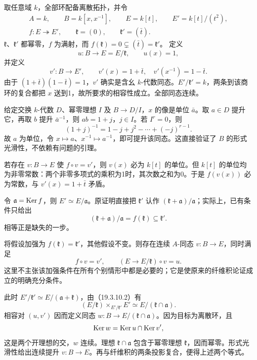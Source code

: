 取任意域 $k$，全部环配备离散拓扑，并令
\[
\begin{gathered}
 A=k,\qquad B=k[x,x^{-1}],\qquad E=k[t],\qquad E'=k[t]/(t^2),\\
 f:E\twoheadrightarrow E',\qquad \mathfrak k=(0),\qquad
 \mathfrak k'=(\bar t).
\end{gathered}
\]
$\mathfrak k$、$\mathfrak k'$ 都幂零，$f$ 为满射，而
$f(\mathfrak k)=0\subsetneq(\bar t)=\mathfrak k'$。
定义
\[
 u:B\longrightarrow E=E/\mathfrak k,\qquad u(x)=1,
\]
并定义
\[
 v':B\longrightarrow E',\qquad
 v'(x)=1+\bar t,\quad v'(x^{-1})=1-\bar t.
\]
由于 $(1+\bar t)(1-\bar t)=1$，$v'$ 确实是含幺 $k$-代数同态。$E'/\mathfrak k'=k$，两条到该商环的复合都把 $x$ 送到1，故所要求的相容性成立。全部同态连续。

给定交换 $k$-代数 $D$、幂零理想 $I$ 及 $B\to D/I$，$x$ 的像是单位 $\bar a$。取 $a\in D$ 提升它，再取 $b$ 提升 $\bar a^{-1}$，则 $ab=1+j$，$j\in I$。若 $I^r=0$，则
\[
 (1+j)^{-1}=1-j+j^2-\cdots+(-j)^{r-1}.
\]
故 $a$ 为单位，令 $x\mapsto a$、$x^{-1}\mapsto a^{-1}$，即可提升该同态。这直接验证了 $B$ 的形式光滑性，不依赖有问题的引理。

若存在 $v:B\to E$ 使 $f\circ v=v'$，则 $v(x)$ 必为 $k[t]$ 的单位。但 $k[t]$ 的单位均为非零常数：两个非零多项式的乘积为1时，其次数之和为0。于是 $f(v(x))$ 必为常数，与 $v'(x)=1+\bar t$ 矛盾。

令 $\mathfrak a=\operatorname{Ker} f$，则 $E'\simeq E/\mathfrak a$。原证明直接把 $\mathfrak k'$ 认作 $(\mathfrak k+\mathfrak a)/\mathfrak a$；实际上，已有条件只给出
\[
 (\mathfrak k+\mathfrak a)/\mathfrak a
   =f(\mathfrak k)\subseteq\mathfrak k'.
\]
相等正是缺失的一步。

将假设加强为 $f(\mathfrak k)=\mathfrak k'$，其他假设不变。则存在连续 $A$-同态 $v:B\to E$，同时满足
\[
 f\circ v=v',\qquad (E\to E/\mathfrak k)\circ v=u.
\]
这里不主张该加强条件在所有个别情形中都是必要的；它是使原来的纤维积论证成立的明确充分条件。

此时 $E'/\mathfrak k'\simeq E/(\mathfrak a+\mathfrak k)$，由（19.3.10.2）有
\[
 (E/\mathfrak k)\times_{E'/\mathfrak k'}E'
 \simeq E/(\mathfrak k\cap\mathfrak a).
\]
相容对 $(u,v')$ 因而定义同态
$w:B\to E/(\mathfrak k\cap\mathfrak a)$。因为目标为离散环，且
\[
 \operatorname{Ker} w=\operatorname{Ker} u\cap\operatorname{Ker} v',
\]
这是两个开理想的交，$w$ 连续。理想 $\mathfrak k\cap\mathfrak a$ 包含于幂零理想 $\mathfrak k$，因而幂零。形式光滑性给出连续提升 $v:B\to E$。再与纤维积的两条投影复合，便得上述两个等式。

